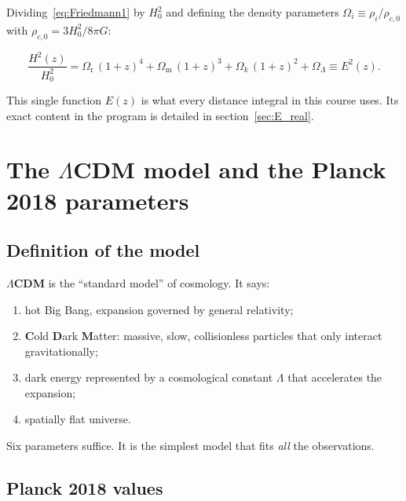 \documentclass[11pt,a4paper,openany]{report}
\newcommand{\Hzero}{H_{0}}
\newcommand{\Om}{\Omega_{\mathrm{m}}}
\newcommand{\Or}{\Omega_{\mathrm{r}}}
\newcommand{\OL}{\Omega_{\Lambda}}
\newcommand{\Ok}{\Omega_{k}}
\newcommand{\eqdef}{\equiv}
\begin{document}
Dividing~\eqref{eq:Friedmann1} by $\Hzero^{2}$ and defining the density
parameters $\Omega_i \eqdef \rho_i/\rho_{c,0}$ with
$\rho_{c,0} = 3\Hzero^{2}/8\pi G$:

\begin{equation}
\boxed{\;\frac{H^{2}(z)}{\Hzero^{2}}
 = \Or\,(1+z)^{4} + \Om\,(1+z)^{3} + \Ok\,(1+z)^{2} + \OL \eqdef E^{2}(z).\;}
\label{eq:Ez}
\end{equation}

\noindent This single function $E(z)$ is what every distance integral in this
course uses. Its exact content in the program is detailed in
section~\ref{sec:E_real}.

\chapter{The \texorpdfstring{$\Lambda$}{Lambda}CDM model and the Planck 2018 parameters}
\label{chap:lcdm}

\section{Definition of the model}

\begin{tcolorbox}[plain]
\textbf{$\Lambda$CDM} is the “standard model” of cosmology. It says:
\begin{enumerate}[topsep=2pt]
\item hot Big Bang, expansion governed by general relativity;
\item \textbf{C}old \textbf{D}ark \textbf{M}atter: massive, slow,
  collisionless particles that only interact gravitationally;
\item dark energy represented by a cosmological constant $\Lambda$ that
  accelerates the expansion;
\item spatially flat universe.
\end{enumerate}
Six parameters suffice. It is the simplest model that fits \emph{all} the
observations.
\end{tcolorbox}

\section{Planck 2018 values}
\end{document}
